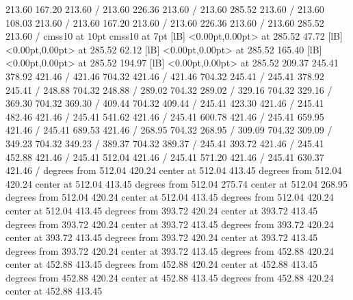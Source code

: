 { 213.60 167.20 213.60 /
 213.60 226.36 213.60 /
 213.60 285.52 213.60 /
\setdashpattern <4pt, 4pt>
 213.60 108.03 213.60 /
 213.60 167.20 213.60 /
 213.60 226.36 213.60 /
 213.60 285.52 213.60 /
\font\picfont cmss10 at 10pt\picfont
\font\picfont cmss10 at 7pt\picfont
{}  [lB] <0.00pt,0.00pt> at 285.52 47.72
  [lB] <0.00pt,0.00pt> at 285.52 62.12
  [lB] <0.00pt,0.00pt> at 285.52 165.40
  [lB] <0.00pt,0.00pt> at 285.52 194.97
  [lB] <0.00pt,0.00pt> at 285.52 209.37
\setsolid
{} 245.41 378.92 421.46 /
 421.46 704.32 421.46 /
 421.46 704.32 245.41 /
 245.41 378.92 245.41 /
\setsolid
{} 248.88 704.32 248.88 /
\setsolid
{} 289.02 704.32 289.02 /
\setsolid
{} 329.16 704.32 329.16 /
\setsolid
{} 369.30 704.32 369.30 /
\setsolid
{} 409.44 704.32 409.44 /
\setsolid
{} 245.41 423.30 421.46 /
\setsolid
{} 245.41 482.46 421.46 /
\setsolid
{} 245.41 541.62 421.46 /
\setsolid
{} 245.41 600.78 421.46 /
\setsolid
{} 245.41 659.95 421.46 /
\setsolid
{} 245.41 689.53 421.46 /
\setsolid
{} 268.95 704.32 268.95 /
\setsolid
{} 309.09 704.32 309.09 /
\setsolid
{} 349.23 704.32 349.23 /
\setsolid
{} 389.37 704.32 389.37 /
\setsolid
{} 245.41 393.72 421.46 /
\setsolid
{} 245.41 452.88 421.46 /
\setsolid
{} 245.41 512.04 421.46 /
\setsolid
{} 245.41 571.20 421.46 /
\setsolid
{} 245.41 630.37 421.46 /
 degrees from 512.04 420.24 center at 512.04 413.45
 degrees from 512.04 420.24 center at 512.04 413.45
 degrees from 512.04 275.74 center at 512.04 268.95
 degrees from 512.04 420.24 center at 512.04 413.45
 degrees from 512.04 420.24 center at 512.04 413.45
 degrees from 393.72 420.24 center at 393.72 413.45
 degrees from 393.72 420.24 center at 393.72 413.45
 degrees from 393.72 420.24 center at 393.72 413.45
 degrees from 393.72 420.24 center at 393.72 413.45
 degrees from 393.72 420.24 center at 393.72 413.45
 degrees from 452.88 420.24 center at 452.88 413.45
 degrees from 452.88 420.24 center at 452.88 413.45
 degrees from 452.88 420.24 center at 452.88 413.45
 degrees from 452.88 420.24 center at 452.88 413.45
}
